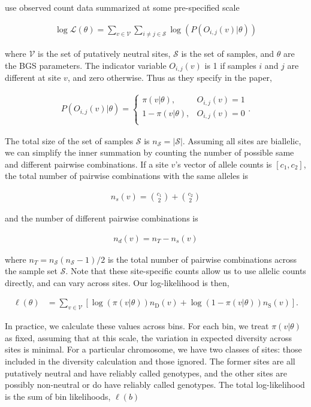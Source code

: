 \documentclass[11pt]{article}
\begin{document}
use observed count data summarized at
some pre-specified scale 

\begin{align}
  \log\mathcal{L}(\theta) = \sum_{v \in \mathcal{V}} \sum_{i \ne j \in \mathcal{S}} \log(P(O_{i,j}(v) | \theta))
\end{align}

where $\mathcal{V}$ is the set of putatively neutral sites, $\mathcal{S}$ is
the set of samples, and $\theta$ are the BGS parameters. The indicator variable
$O_{i,j}(v)$ is 1 if samples $i$ and $j$ are different at site $v$, and zero
otherwise. Thus as they specify in the paper, 

\begin{align}
  P(O_{i,j}(v) | \theta) = 
    \begin{cases}
      \pi(v | \theta), & O_{i,j}(v) = 1 \\
      1-\pi(v | \theta), & O_{i,j}(v) = 0 \\
    \end{cases}.
\end{align}

The total size of the set of samples $\mathcal{S}$ is $n_\mathcal{S} =
|\mathcal{S}|$. Assuming all sites are biallelic, we can simplify the inner
summation by counting the number of possible same and different pairwise
combinations. If a site $v$'s vector of allele counts is $[c_1, c_2]$, the
total number of pairwise combinations with the same alleles is

\begin{align}
  n_s(v) = {c_1 \choose 2} + {c_2 \choose 2}
\end{align}

and the number of different pairwise combinations is 

\begin{align}
  n_d(v) = n_T - n_s(v)
\end{align}

where $n_T = n_\mathcal{S} (n_\mathcal{S} - 1) / 2$  is the total number of
pairwise combinations across the sample set $\mathcal{S}$. Note that these
site-specific counts allow us to use allelic counts directly, and can vary
across sites. Our log-likelihood is then,

\begin{align}
  \ell(\theta) &= \sum_{v \in \mathcal{V}} \left[\log(\pi(v | \theta)) n_\text{D}(v) + \log(1-\pi(v | \theta)) n_\text{S}(v)\right].
\end{align}

In practice, we calculate these values across bins. For each bin, we treat
$\pi(v | \theta)$ as fixed, assuming that at this scale, the variation in
expected diversity across sites is minimal. For a particular chromosome, we
have two classes of sites: those included in the diversity calculation and
those ignored. The former sites are all putatively neutral and have reliably
called genotypes, and the other sites are possibly non-neutral or do have
reliably called genotypes. The total log-likelihood is the sum of bin likelihoods,
$\ell(b)$
\end{document}
